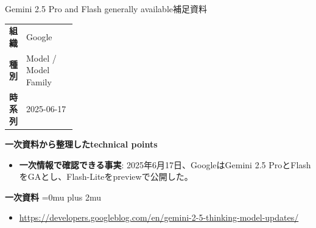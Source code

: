 \begin{technicalnote}{Gemini 2.5 Pro and Flash generally available}{補足資料}
\begingroup
\begin{tabularx}{\linewidth}{@{}>{\bfseries}p{0.22\linewidth}X@{}}
組織 & Google \\
種別 & Model / Model Family \\
時系列 & 2025-06-17 \\
\end{tabularx}
\smallskip
\begin{minipage}{\linewidth}
{\bfseries 一次資料から整理したtechnical points}
\begin{itemize}[leftmargin=1.5em,itemsep=0.35em]
\item \textbf{一次情報で確認できる事実}: 2025年6月17日、GoogleはGemini 2.5 ProとFlashをGAとし、Flash-Liteをpreviewで公開した。
\end{itemize}
\begin{samepage}
{\bfseries 一次資料}
\begingroup\sloppy
\Urlmuskip=0mu plus 2mu\relax
\begin{itemize}[leftmargin=1.5em,itemsep=0.25em]
\item {\scriptsize\url{https://developers.googleblog.com/en/gemini-2-5-thinking-model-updates/}}
\end{itemize}
\endgroup
\end{samepage}
\end{minipage}
\endgroup
\end{technicalnote}
\medskip
